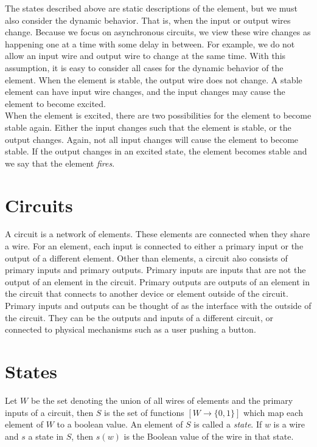 \documentclass[12pt]{report}
\begin{document}
The states described above are static descriptions of the element, but we must also consider the dynamic behavior.  
That is, when the input or output wires change.  Because we focus on asynchronous circuits, we view these wire changes as happening one at a time with some delay in between.  For example, we do not allow an input wire and output wire to change at the same time.  With this assumption, it is easy to consider all cases for the dynamic behavior of the element.  When the element is stable, the output wire does not change.  A stable element can have input wire changes, and the input changes may cause the element to become excited.  \\

When the element is excited, there are two possibilities for the element to become stable again.  Either the input changes such that the element is stable, or the output changes.  Again, not all input changes will cause the element to become stable. If the output changes in an excited state, the element becomes stable and we say that the element {\em fires}.

\section{Circuits}
A circuit is a network of elements.  These elements are connected when they share a wire.  For an element, each input is connected to either a primary input or the output of a different element.  Other than elements, a circuit also consists of primary inputs and primary outputs.  Primary inputs are inputs that are not the output of an element in the circuit.  Primary outputs are outputs of an element in the circuit that connects to another device or element outside of the circuit.  Primary inputs and outputs can be thought of as the interface with the outside of the circuit.  They can be the outputs and inputs of a different circuit, or connected to physical mechanisms such as a user pushing a button.
    
\section{States}
Let $W$ be the set denoting the union of all wires of elements and the primary inputs of a circuit, then $S$ is the set of functions $[W\to \{0,1\}]$ which map each element of $W$ to a boolean value.  An element of $S$ is called a {\em state}.  If $w$ is a wire and $s$ a state in $S$, then $s(w)$ is the Boolean value of the wire in that state.
\end{document}
